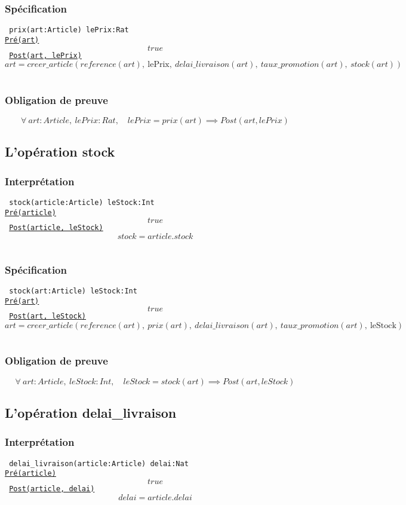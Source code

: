 \documentclass{article}
\begin{document}
\subsubsection{Spécification}
{\tt
prix(art:Article)  lePrix:Rat\\
\underline{Pré(art)}
$$ true $$
\underline{Post(art, lePrix)}
$$ art = creer\_article(reference(art),\ \text{lePrix},\ delai\_livraison(art),\ taux\_promotion(art),\ stock(art)) $$
}

\subsubsection{Obligation de preuve}
$$ \forall\ art:Article,\ lePrix:Rat,\quad lePrix = prix(art) \implies Post(art,lePrix) $$

\subsection{L'opération stock}
\subsubsection{Interprétation}
{\tt
stock(article:Article) leStock:Int\\
\underline{Pré(article)}
$$ true $$
\underline{Post(article, leStock)}
$$ stock = article.stock $$
}

\subsubsection{Spécification}
{\tt
stock(art:Article) leStock:Int\\
\underline{Pré(art)}
$$ true $$
\underline{Post(art, leStock)}
$$ art = creer\_article(reference(art),\ prix(art),\ delai\_livraison(art),\ taux\_promotion(art),\ \text{leStock}) $$
}

\subsubsection{Obligation de preuve}
$$ \forall\ art:Article,\ leStock:Int,\quad leStock = stock(art) \implies Post(art, leStock)$$

\subsection{L'opération delai\_livraison}
\subsubsection{Interprétation}
{\tt
delai\_livraison(article:Article) delai:Nat\\
\underline{Pré(article)}
$$ true $$
\underline{Post(article, delai)}
$$ delai = article.delai $$
}
\end{document}

